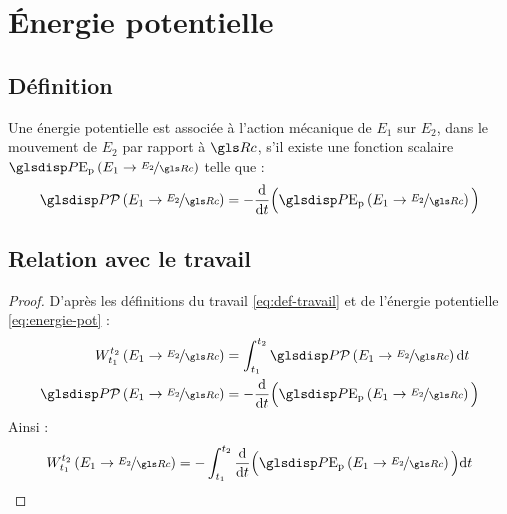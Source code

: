 \section{\'Energie potentielle}
	\subsection{Définition}
\begin{definition}
	Une énergie potentielle est associée à l'action mécanique de $E_1$ sur $E_2$, dans le mouvement de $E_2$ par rapport à $\Rc$, s'il existe une fonction scalaire $\Ep{E_1}{E_2}$ telle que :
	\begin{equation}
		\puiss{E_1}{E_2}=-\frac{\mathrm{d}}{\mathrm{d}t}\Big(\Ep{E_1}{E_2}\Big)
		\label{eq:energie-pot}
	\end{equation}
\end{definition}

	\subsection{Relation avec le travail}
	\begin{theorem}
	\end{theorem}
	\begin{proof}
		D'après les définitions du travail \eqref{eq:def-travail} et de l'énergie potentielle \eqref{eq:energie-pot} :
			\begin{align*}
				W_{t_1}^{t_2}\left(E_1\rightarrow \nicefrac{E_2}{\Rc}\right)&=\int_{t_1}^{t_2}\puiss{E_1}{E_2}\mathrm{d}t\\
				\puiss{E_1}{E_2}&=-\frac{\mathrm{d}}{\mathrm{d}t}\Big(\Ep{E_1}{E_2}\Big)
			\end{align*}
		Ainsi :
		\begin{equation*}
			W_{t_1}^{t_2}\left(E_1\rightarrow \nicefrac{E_2}{\Rc}\right)=-\int_{t_1}^{t_2}\frac{\mathrm{d}}{\mathrm{d}t}\Big(\Ep{E_1}{E_2}\Big)\mathrm{d}t
		\end{equation*}
		
	\end{proof}


